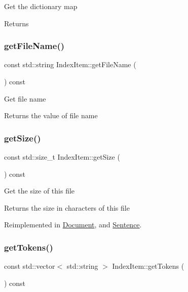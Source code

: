 Get the dictionary map \begin{DoxyReturn}{Returns}

\end{DoxyReturn}
\mbox{\label{classIndexItem_a269c754227e606efd271bea3e56701f8}} 
\subsubsection{\texorpdfstring{get\+File\+Name()}{getFileName()}}
{\footnotesize\ttfamily const std\+::string Index\+Item\+::get\+File\+Name (\begin{DoxyParamCaption}{ }\end{DoxyParamCaption}) const}

Get file name \begin{DoxyReturn}{Returns}
the value of file name 
\end{DoxyReturn}
\mbox{\label{classIndexItem_a37bb9320946eedfe8360bc740eb0c11b}} 
\subsubsection{\texorpdfstring{get\+Size()}{getSize()}}
{\footnotesize\ttfamily const std\+::size\+\_\+t Index\+Item\+::get\+Size (\begin{DoxyParamCaption}{ }\end{DoxyParamCaption}) const\hspace{0.3cm}{\ttfamily [virtual]}}

Get the size of this file \begin{DoxyReturn}{Returns}
the size in characters of this file 
\end{DoxyReturn}


Reimplemented in \hyperlink{classDocument_a81ccfd6f3de713047ccb52a45842dc26}{Document}, and \hyperlink{classSentence_a2f55ca4244f2ee9c1762019b37734330}{Sentence}.

\mbox{\label{classIndexItem_ae37a9af94cfcc8f76fd3081b8096b31a}} 
\subsubsection{\texorpdfstring{get\+Tokens()}{getTokens()}}
{\footnotesize\ttfamily const std\+::vector$<$ std\+::string $>$ Index\+Item\+::get\+Tokens (\begin{DoxyParamCaption}{ }\end{DoxyParamCaption}) const}

